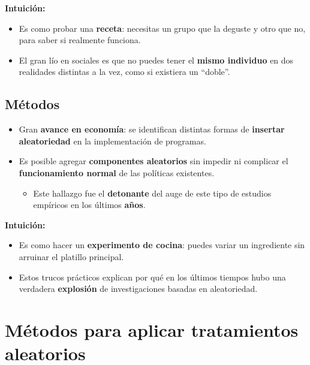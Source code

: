 \documentclass[12pt]{article}
\begin{document}
\textbf{Intuición:}
\begin{itemize}
    \item Es como probar una \textbf{receta}: necesitas un grupo que la deguste y otro que no, para saber si realmente funciona.
    \item El gran lío en sociales es que no puedes tener el \textbf{mismo individuo} en dos realidades distintas a la vez, como si existiera un “doble”.
\end{itemize}

\subsection*{\noindent\textbf{Métodos}}

\begin{itemize}
    \item Gran \textbf{avance en economía}: se identifican distintas formas de \textbf{insertar aleatoriedad} en la implementación de programas.
    \item Es posible agregar \textbf{componentes aleatorios} sin impedir ni complicar el \textbf{funcionamiento normal} de las políticas existentes.
    \begin{itemize}
        \item Este hallazgo fue el \textbf{detonante} del auge de este tipo de estudios empíricos en los últimos \textbf{años}.
    \end{itemize}
\end{itemize}

\textbf{Intuición:}
\begin{itemize}
    \item Es como hacer un \textbf{experimento de cocina}: puedes variar un ingrediente sin arruinar el platillo principal.
    \item Estos trucos prácticos explican por qué en los últimos tiempos hubo una verdadera \textbf{explosión} de investigaciones basadas en aleatoriedad.
\end{itemize}

\section*{\noindent\textbf{Métodos para aplicar tratamientos aleatorios}}
\end{document}

